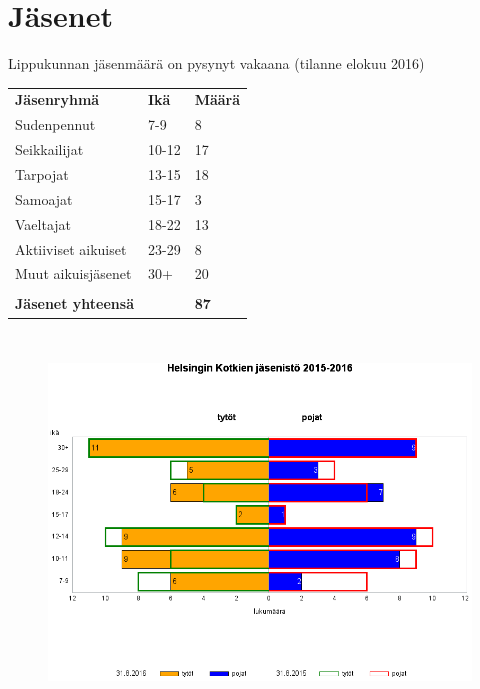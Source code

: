 \section{Jäsenet}
Lippukunnan jäsenmäärä on pysynyt vakaana (tilanne elokuu 2016)\\
\begin{center}
\begin{tabular}{ l l l }
	\textbf{Jäsenryhmä} & \textbf{Ikä} & \textbf{Määrä}\\
	Sudenpennut & 7-9 & 8\\
	Seikkailijat & 10-12 & 17\\
	Tarpojat & 13-15 & 18\\
	Samoajat & 15-17 & 3\\
	Vaeltajat & 18-22 & 13\\
	Aktiiviset aikuiset & 23-29 & 8\\
	Muut aikuisjäsenet & 30+ & 20\\
				   & & \\
	\textbf{Jäsenet yhteensä} & & \textbf{87}
\end{tabular}
\begin{figure}[htb]
	\begin{center}
		\includegraphics[height=10cm]{kuvat/jasenet.png}
	\end{center}
\end{figure}


\end{center}
